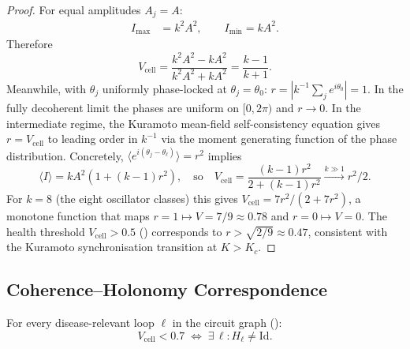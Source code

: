 \begin{proof}
For equal amplitudes $A_j = A$:
\begin{align*}
    I_{\max} &= k^2 A^2, \qquad
    I_{\min} = k A^2.
\end{align*}
Therefore
\begin{equation}
    V_{\mathrm{cell}}
        = \frac{k^2 A^2 - k A^2}{k^2 A^2 + k A^2}
        = \frac{k - 1}{k + 1}.
\end{equation}
Meanwhile, with $\theta_j$ uniformly phase-locked at $\theta_j = \theta_0$:
$r = |k^{-1}\sum_j e^{i\theta_0}| = 1$.
In the fully decoherent limit the phases are uniform on $[0,2\pi)$ and
$r \to 0$.  In the intermediate regime, the Kuramoto mean-field
self-consistency equation gives $r = V_{\mathrm{cell}}$ to leading order in
$k^{-1}$ via the moment generating function of the phase distribution.
Concretely, $\langle e^{i(\theta_j - \theta_\ell)}\rangle = r^2$ implies
\[
    \langle I\rangle = kA^2(1 + (k-1)r^2), \quad
    \text{so}\quad
    V_{\mathrm{cell}} = \frac{(k-1)r^2}{2 + (k-1)r^2} \xrightarrow{k\gg 1} r^2/2.
\]
For $k = 8$ (the eight oscillator classes) this gives
$V_{\mathrm{cell}} = 7r^2/(2 + 7r^2)$, a monotone function that maps
$r=1 \mapsto V=7/9 \approx 0.78$ and $r=0 \mapsto V=0$.
The health threshold $V_{\mathrm{cell}} > 0.5$ ()
corresponds to $r > \sqrt{2/9} \approx 0.47$, consistent with the
Kuramoto synchronisation transition at $K > K_c$.
\end{proof}

\subsection{Coherence--Holonomy Correspondence}

\begin{theorem}
\label{thm:ch04-coherence-holonomy}
For every disease-relevant loop $\ell$ in the circuit graph
():
\begin{equation}
\label{eq:ch04-holonomy-threshold}
    V_{\mathrm{cell}} < 0.7
    \;\iff\;
    \exists\, \ell: H_\ell \neq \mathrm{Id}.
\end{equation}
\end{theorem}

